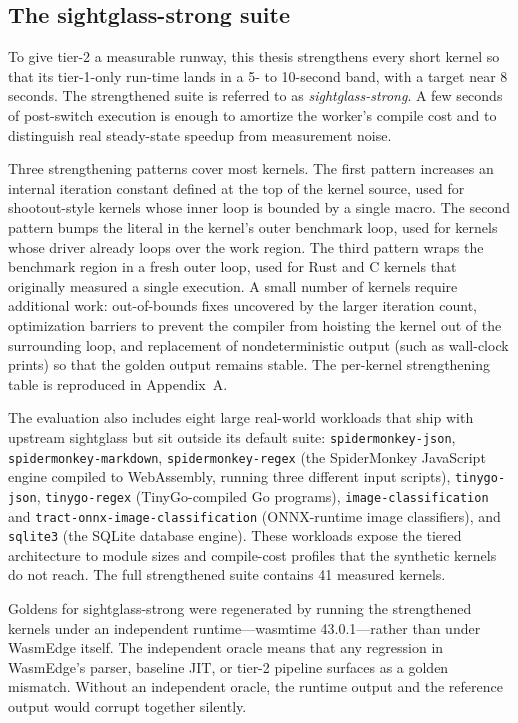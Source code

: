 \subsection{The sightglass-strong suite}
\label{sec:eval:method:strong}

To give tier-2 a measurable runway, this thesis strengthens every short kernel so that its tier-1-only run-time lands in a 5- to 10-second band, with a target near 8 seconds. The strengthened suite is referred to as \emph{sightglass-strong}. A few seconds of post-switch execution is enough to amortize the worker's compile cost and to distinguish real steady-state speedup from measurement noise.

Three strengthening patterns cover most kernels. The first pattern increases an internal iteration constant defined at the top of the kernel source, used for shootout-style kernels whose inner loop is bounded by a single macro. The second pattern bumps the literal in the kernel's outer benchmark loop, used for kernels whose driver already loops over the work region. The third pattern wraps the benchmark region in a fresh outer loop, used for Rust and C kernels that originally measured a single execution. A small number of kernels require additional work: out-of-bounds fixes uncovered by the larger iteration count, optimization barriers to prevent the compiler from hoisting the kernel out of the surrounding loop, and replacement of nondeterministic output (such as wall-clock prints) so that the golden output remains stable. The per-kernel strengthening table is reproduced in Appendix~A.

The evaluation also includes eight large real-world workloads that ship with upstream sightglass but sit outside its default suite: \texttt{spidermonkey-json}, \texttt{spidermonkey-markdown}, \texttt{spidermonkey-regex} (the SpiderMonkey JavaScript engine compiled to WebAssembly, running three different input scripts), \texttt{tinygo-json}, \texttt{tinygo-regex} (TinyGo-compiled Go programs), \texttt{image-classification} and \texttt{tract-onnx-image-classification} (ONNX-runtime image classifiers), and \texttt{sqlite3} (the SQLite database engine). These workloads expose the tiered architecture to module sizes and compile-cost profiles that the synthetic kernels do not reach. The full strengthened suite contains 41 measured kernels.

Goldens for sightglass-strong were regenerated by running the strengthened kernels under an independent runtime---wasmtime 43.0.1---rather than under WasmEdge itself. The independent oracle means that any regression in WasmEdge's parser, baseline JIT, or tier-2 pipeline surfaces as a golden mismatch. Without an independent oracle, the runtime output and the reference output would corrupt together silently.

